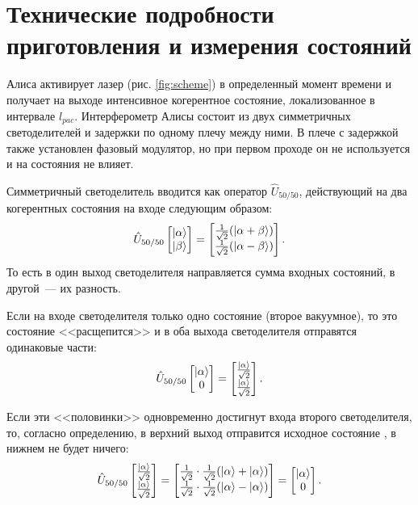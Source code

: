 \section[Технические подробности]{Технические подробности приготовления и измерения состояний}
Алиса активирует лазер (рис. \ref{fig:scheme}) в определенный момент времени и получает на выходе интенсивное когерентное состояние, локализованное в интервале $l_{pac}$. 
Интерферометр Алисы состоит из двух симметричных светоделителей и задержки по одному плечу между ними. В плече с задержкой также установлен фазовый модулятор, но при первом проходе он не используется и на состояния не влияет. 

Симметричный светоделитель вводится как оператор $\hat{U}_{50/50}$, действующий на два когерентных состояния на входе следующим образом:
\begin{equation}
  \hat{U}_{50/50} 
  \begin{bmatrix}
    \left| \alpha \right\rangle \\
    \left| \beta \right\rangle
  \end{bmatrix}
  =
  \begin{bmatrix}
    \frac{1}{\sqrt{2}}(\left| \alpha + \beta \right\rangle) \\
    \frac{1}{\sqrt{2}}(\left| \alpha - \beta \right\rangle)
  \end{bmatrix}.
\end{equation}
То есть в один выход светоделителя направляется сумма входных состояний, в другой~--- их разность.

Если на входе светоделителя только одно состояние (второе вакуумное), то это состояние <<расщепится>> и в оба выхода светоделителя отправятся одинаковые части:
\begin{equation}
  \hat{U}_{50/50} 
  \begin{bmatrix}
    \left| \alpha \right\rangle \\
    0
  \end{bmatrix}
  =
  \begin{bmatrix}
    \frac{\left| \alpha \right\rangle}{\sqrt{2}} \\
    \frac{\left| \alpha \right\rangle}{\sqrt{2}}
  \end{bmatrix}.
\end{equation}

Если эти <<половинки>> одновременно достигнут входа второго светоделителя, то, согласно определению, в верхний выход отправится исходное состояние \state{\alpha}, в нижнем не будет ничего:
\begin{equation}
  \hat{U}_{50/50} 
  \begin{bmatrix}
    \frac{\left| \alpha \right\rangle}{\sqrt{2}} \\
    \frac{\left| \alpha \right\rangle}{\sqrt{2}}
  \end{bmatrix}  
  =
  \begin{bmatrix}
    \frac{1}{\sqrt{2}} \cdot \frac{1}{\sqrt{2}}(\left| \alpha \right\rangle+\left| \alpha \right\rangle) \\
    \frac{1}{\sqrt{2}} \cdot \frac{1}{\sqrt{2}}(\left| \alpha \right\rangle-\left| \alpha \right\rangle)
  \end{bmatrix}
  =
  \begin{bmatrix}
    \left| \alpha \right\rangle \\
    0
  \end{bmatrix}.
\end{equation}

